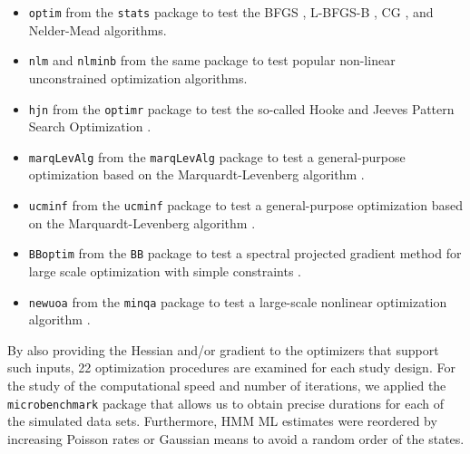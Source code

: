 \documentclass[]{interact}\usepackage[]{graphicx}\usepackage[dvipsnames]{xcolor}
\theoremstyle{plain}%
\theoremstyle{definition}
\theoremstyle{remark}
\begin{document}
\begin{itemize}
\item \texttt{optim} from the {\tt{stats}} package to test the BFGS \citep{broyden, fletchera, goldfarb, shanno}, L-BFGS-B \citep{byrd}, CG \citep{fletcher}, and Nelder-Mead \citep{nelder} algorithms. 
\item \texttt{nlm} \citep{dennisa} and \texttt{nlminb} \citep{gay} from the same package to test popular non-linear unconstrained optimization algorithms.
\item \texttt{hjn} from the {\tt{optimr}} package \citep{R-optimr} to test the so-called Hooke and Jeeves Pattern Search Optimization \citep{hooke}.
\item \texttt{marqLevAlg} from the {\tt{marqLevAlg}} package \citep{R-marqLevAlg} to test a general-purpose optimization based on the Marquardt-Levenberg algorithm \citep{levenberg, marquardt}.
\item \texttt{ucminf} from the {\tt{ucminf}} package \citep{R-ucminf} to test a general-purpose optimization based on the Marquardt-Levenberg algorithm \citep{nielsen}.
\item \texttt{BBoptim} from the {\tt{BB}} package \citep{R-BB} to test a spectral projected gradient method for large scale optimization with simple constraints \citep{varadhan}.
\item \texttt{newuoa} from the {\tt{minqa}} package \citep{R-minqa} to test a large-scale nonlinear optimization algorithm \cite{powell}.
\end{itemize}


By also providing the Hessian and/or gradient to the optimizers that support such inputs, 22 optimization procedures are examined for each study design.
For the study of the computational speed and number of iterations, we applied the  {\tt{microbenchmark}} package \citep{R-microbenchmark} that allows us to obtain precise durations for each of the simulated data sets. Furthermore, HMM ML estimates were reordered by increasing Poisson rates or Gaussian means to avoid a random order of the states.

\end{document}
